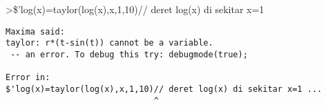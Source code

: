 \documentclass[
]{book}
\begin{document}
\textgreater\$'log(x)=taylor(log(x),x,1,10)// deret log(x) di sekitar x=1

\begin{verbatim}
Maxima said:
taylor: r*(t-sin(t)) cannot be a variable.
 -- an error. To debug this try: debugmode(true);

Error in:
$'log(x)=taylor(log(x),x,1,10)// deret log(x) di sekitar x=1 ...
                              ^
\end{verbatim}

\backmatter
\end{document}
